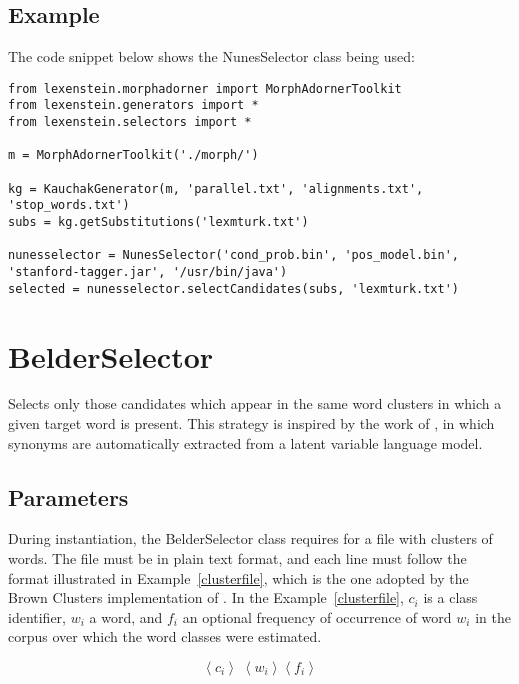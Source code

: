\subsection{Example}

The code snippet below shows the NunesSelector class being used:

\begin{lstlisting}
from lexenstein.morphadorner import MorphAdornerToolkit
from lexenstein.generators import *
from lexenstein.selectors import *

m = MorphAdornerToolkit('./morph/')

kg = KauchakGenerator(m, 'parallel.txt', 'alignments.txt', 'stop_words.txt')
subs = kg.getSubstitutions('lexmturk.txt')

nunesselector = NunesSelector('cond_prob.bin', 'pos_model.bin', 'stanford-tagger.jar', '/usr/bin/java')
selected = nunesselector.selectCandidates(subs, 'lexmturk.txt')
\end{lstlisting}














\section{BelderSelector}

Selects only those candidates which appear in the same word clusters in which a given target word is present. This strategy is inspired by the work of \cite{Belder2010}, in which synonyms are automatically extracted from a latent variable language model.

\subsection{Parameters}

During instantiation, the BelderSelector class requires for a file with clusters of words. The file must be in plain text format, and each line must follow the format illustrated in Example~\ref{clusterfile}, which is the one adopted by the Brown Clusters implementation of \cite{brownclusters}. In the Example~\ref{clusterfile}, $c_{i}$ is a class identifier, $w_{i}$ a word, and $f_{i}$ an optional frequency of occurrence of word $w_{i}$ in the corpus over which the word classes were estimated.

\begin{equation}
\label{clusterfile}
\left\langle c_{i} \right\rangle\; \left\langle w_{i} \right\rangle \left\langle f_{i} \right\rangle
\end{equation}

